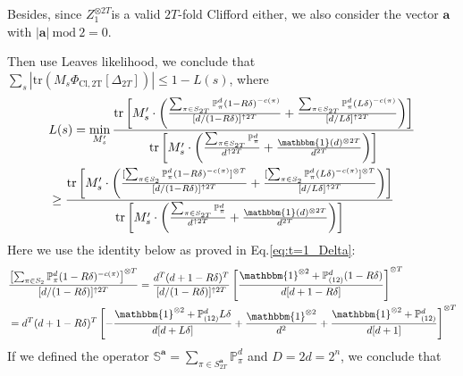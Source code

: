 \documentclass[aps,%
twocolumn,%
floatfix,%
pra,%
amsfonts,%
groupedaddress,%
superscriptaddress]{revtex4-2}%
\newcommand{\1}{\mathbbm{1}}
\begin{document}
Besides, since $Z_1^{\otimes 2T} $is a valid  $2T$-fold Clifford either, we also consider the vector $\mathbf{a}$ with $|\mathbf{a}| \mathrm{~mod~} 2 = 0$.


Then use Leaves likelihood, we conclude that $ \sum_{s}|\mathrm{tr}(M_s \Phi_{\mathrm{Cl,2T}}[\Delta_{2T}])|  \leq 1 -  L(s)$, where
\begin{align}
    &L(s) = \min_{M'_s}  \frac{\mathrm{tr}\left[M'_s \cdot\left(\frac{\sum_{\pi \in S_{2T}} \mathbb{P}_{\pi}^{d} (1 - R \delta)^{-c(\pi)} }{[d/(1 - R\delta)]^{\uparrow 2T} }   +\frac{\sum_{\pi \in S_{2T}} \mathbb{P}_{\pi }^{d}  (L\delta)^{-c(\pi)}}{[d/L\delta]^{\uparrow 2T}}\right)\right]}{\mathrm{tr}\left[M'_s\cdot\left(\frac{\sum_{\pi \in S_{2T}} \mathbb{P}_{\pi}^{d}}{d^{\uparrow 2T} }  + \frac{\1(d)^{\otimes 2T}}{ d^{2T}} \right)\right]} \\
    &\geq \frac{\mathrm{tr}\left[M'_s \cdot\left(\frac{[\sum_{\pi \in S_{2}} \mathbb{P}_{\pi}^{d} (1 - R \delta)^{-c(\pi)}]^{\otimes T} }{[d/(1 - R\delta)]^{\uparrow 2T} }   +\frac{[\sum_{\pi \in S_{2}} \mathbb{P}_{\pi }^{d}  (L\delta)^{-c(\pi)}]^{\otimes T}}{[d/L\delta]^{\uparrow 2T}}\right)\right]}{\mathrm{tr}\left[M'_s\cdot\left(\frac{\sum_{\pi \in S_{2T}} \mathbb{P}_{\pi}^{d}}{d^{\uparrow 2T} }  + \frac{\1(d)^{\otimes 2T}}{ d^{2T}} \right)\right]} 
\end{align}
Here we use the identity below as proved in Eq.\eqref{eq:t=1_Delta}:
\begin{align}
    &\frac{\left[\sum_{\pi \in S_2} \mathbb{P}_{\pi}^d (1 - R\delta)^{-c(\pi)}\right]^{\otimes T}}{[d/(1 - R\delta)]^{\uparrow 2T} }= \frac{d^T(d+1-R\delta)^T}{[d/(1 - R\delta)]^{\uparrow 2T} }\left[\frac{\1^{\otimes 2} + \mathbb{P}^{d}_{(12)}(1 -R\delta)}{d[d+ 1 -R\delta] }\right]^{\otimes T} \\
    &=d^T(d+1-R\delta)^T\left[-\frac{\1^{\otimes 2} + \mathbb{P}^{d}_{(12)}L\delta}{d[d + L\delta] } +  \frac{\1^{\otimes 2}}{ d^{2}} + \frac{\1^{\otimes 2}  + \mathbb{P}^{d}_{(12)}}{d[d + 1] } \right]^{\otimes T}
\end{align}
If we defined the operator $\mathbb{S}^{\mathbf{a}} = \sum_{\pi \in S_{2T}^{\mathbf{a}}} \mathbb{P}_{\pi}^{d}$ and $D = 2d = 2^n$, we conclude that
\end{document}
